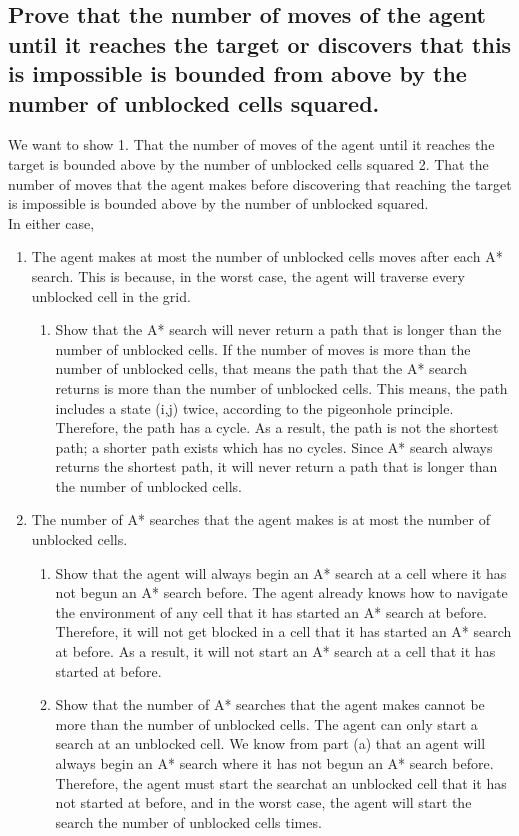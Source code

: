 \documentclass{article}
\begin{document}
\subsection{Prove that the number of moves of the agent until it reaches the target or discovers that this is impossible is bounded from above by the number of unblocked cells squared.}

We want to show 1. That the number of moves of the agent until it reaches the target is bounded above by the number of unblocked cells squared  2. That the number of moves that the agent makes before discovering that reaching the target is impossible is bounded above by the number of unblocked squared.\\

In either case, 
\begin{enumerate}
	\item The agent makes at most the number of unblocked cells moves after each A* search. This is because, in the worst case, the agent will traverse every unblocked cell in the grid. 
	\begin{enumerate}
		\item Show that the A* search will never return a path that is longer than the number of unblocked cells.  If the number of moves is more than the number of unblocked cells, that means the path that the A* search returns is more than the number of unblocked cells. This means, the path includes a state (i,j) twice, according to the pigeonhole principle. Therefore, the path has a cycle. As a result, the path is not the shortest path; a shorter path exists which has no cycles. Since A* search always returns the shortest path, it will never return a path that is longer than the number of unblocked cells.
	\end{enumerate}
	\item The number of A* searches that the agent makes is at most the number of unblocked cells.
	\begin{enumerate}
		\item Show that the agent will always begin an A* search at a cell where it has not begun an A* search before.  The agent already knows how to navigate the environment of any cell that it has started an A* search at before. Therefore, it will not get blocked in a cell that it has started an A* search at before. As a result, it will not start an A* search at a cell that it has started at before. 
		\item Show that the number of A* searches that the agent makes cannot be more than the number of unblocked cells. The agent can only start a search at an unblocked cell. We know from part (a) that an agent will always begin an A* search where it has not begun an A* search before. Therefore, the agent must start the searchat  an unblocked cell that it has not started at before, and in the worst case, the agent will start the search the number of unblocked cells times.
	\end{enumerate} 
\end {enumerate}
\end{document}
